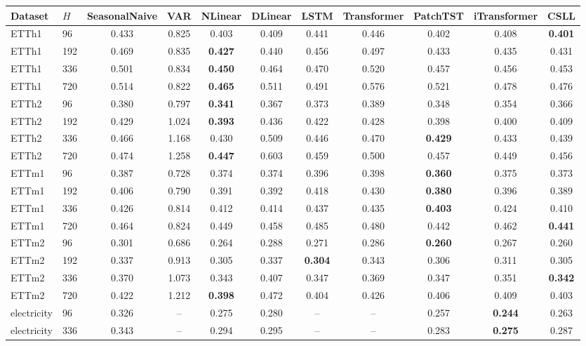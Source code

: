 \begin{tabular}{llccccccccc}
\toprule
Dataset & $H$ & SeasonalNaive & VAR & NLinear & DLinear & LSTM & Transformer & PatchTST & iTransformer & CSLL \\
\midrule
ETTh1 & 96 & 0.433 & 0.825 & 0.403 & 0.409 & 0.441 & 0.446 & 0.402 & 0.408 & \textbf{0.401} \\
ETTh1 & 192 & 0.469 & 0.835 & \textbf{0.427} & 0.440 & 0.456 & 0.497 & 0.433 & 0.435 & 0.431 \\
ETTh1 & 336 & 0.501 & 0.834 & \textbf{0.450} & 0.464 & 0.470 & 0.520 & 0.457 & 0.456 & 0.453 \\
ETTh1 & 720 & 0.514 & 0.822 & \textbf{0.465} & 0.511 & 0.491 & 0.576 & 0.521 & 0.478 & 0.476 \\
ETTh2 & 96 & 0.380 & 0.797 & \textbf{0.341} & 0.367 & 0.373 & 0.389 & 0.348 & 0.354 & 0.366 \\
ETTh2 & 192 & 0.429 & 1.024 & \textbf{0.393} & 0.436 & 0.422 & 0.428 & 0.398 & 0.400 & 0.409 \\
ETTh2 & 336 & 0.466 & 1.168 & 0.430 & 0.509 & 0.446 & 0.470 & \textbf{0.429} & 0.433 & 0.439 \\
ETTh2 & 720 & 0.474 & 1.258 & \textbf{0.447} & 0.603 & 0.459 & 0.500 & 0.457 & 0.449 & 0.456 \\
ETTm1 & 96 & 0.387 & 0.728 & 0.374 & 0.374 & 0.396 & 0.398 & \textbf{0.360} & 0.375 & 0.373 \\
ETTm1 & 192 & 0.406 & 0.790 & 0.391 & 0.392 & 0.418 & 0.430 & \textbf{0.380} & 0.396 & 0.389 \\
ETTm1 & 336 & 0.426 & 0.814 & 0.412 & 0.414 & 0.437 & 0.435 & \textbf{0.403} & 0.424 & 0.410 \\
ETTm1 & 720 & 0.464 & 0.824 & 0.449 & 0.458 & 0.485 & 0.480 & 0.442 & 0.462 & \textbf{0.441} \\
ETTm2 & 96 & 0.301 & 0.686 & 0.264 & 0.288 & 0.271 & 0.286 & \textbf{0.260} & 0.267 & 0.260 \\
ETTm2 & 192 & 0.337 & 0.913 & 0.305 & 0.337 & \textbf{0.304} & 0.343 & 0.306 & 0.311 & 0.305 \\
ETTm2 & 336 & 0.370 & 1.073 & 0.343 & 0.407 & 0.347 & 0.369 & 0.347 & 0.351 & \textbf{0.342} \\
ETTm2 & 720 & 0.422 & 1.212 & \textbf{0.398} & 0.472 & 0.404 & 0.426 & 0.406 & 0.409 & 0.403 \\
electricity & 96 & 0.326 & -- & 0.275 & 0.280 & -- & -- & 0.257 & \textbf{0.244} & 0.263 \\
electricity & 336 & 0.343 & -- & 0.294 & 0.295 & -- & -- & 0.283 & \textbf{0.275} & 0.287 \\

\end{tabular}

